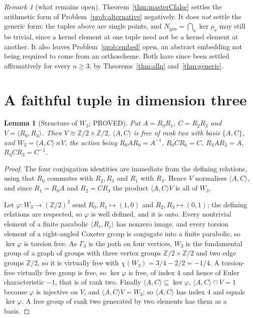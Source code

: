 \documentclass[11pt]{article}
\newtheorem{lemma}[theorem]{Lemma}
\theoremstyle{definition}
\theoremstyle{remark}
\newtheorem{remark}[theorem]{Remark}
\theoremstyle{definition}
\newcommand{\Z}{\mathbb{Z}}
\begin{document}
\begin{remark}[what remains open]\label{rem:stillopen}
Theorem~\ref{thm:masterCfalse} settles the arithmetic form of Problem~\ref{prob:alternative}
negatively. It does \emph{not} settle the generic form: the tuples above are single points, and
$N_{\mathrm{gen}}=\bigcap_a\ker\rho_a$ may still be trivial, since a kernel element at one tuple
need not be a kernel element at another. It also leaves Problem~\ref{prob:embed} open, an
abstract embedding not being required to come from an orthoscheme. Both have since been settled
affirmatively for every $n\ge3$, by Theorems~\ref{thm:alln} and~\ref{thm:generic}.
\end{remark}

\section{A faithful tuple in dimension three}\label{sec:faithful}

\begin{lemma}[Structure of $W_3$; PROVED]\label{lem:W3struct}
Put $A=R_0R_1$, $C=R_2R_3$ and $V=\langle R_0,R_3\rangle$. Then $V\cong\Z/2\times\Z/2$,
$\langle A,C\rangle$ is free of rank two with basis $\{A,C\}$, and
$W_3=\langle A,C\rangle\rtimes V$, the action being
$R_0AR_0=A^{-1}$, $R_0CR_0=C$, $R_3AR_3=A$, $R_3CR_3=C^{-1}$.
\end{lemma}

\begin{proof}
The four conjugation identities are immediate from the defining relations, using that $R_0$
commutes with $R_2,R_3$ and $R_1$ with $R_3$. Hence $V$ normalises $\langle A,C\rangle$, and since
$R_1=R_0A$ and $R_2=CR_3$ the product $\langle A,C\rangle V$ is all of $W_3$.

Let $\varphi\colon W_3\to(\Z/2)^2$ send $R_0,R_1\mapsto(1,0)$ and $R_2,R_3\mapsto(0,1)$; the
defining relations are respected, so $\varphi$ is well defined, and it is onto. Every nontrivial
element of a finite parabolic $\langle R_i,R_j\rangle$ has nonzero image, and every torsion
element of a right-angled Coxeter group is conjugate into a finite parabolic, so $\ker\varphi$ is
torsion free. As $\Gamma_3$ is the path on four vertices, $W_3$ is the fundamental group of a
graph of groups with three vertex groups $\Z/2\times\Z/2$ and two edge groups $\Z/2$, so it is
virtually free with $\chi(W_3)=3/4-2/2=-1/4$. A torsion-free virtually free group is free, so
$\ker\varphi$ is free, of index $4$ and hence of Euler characteristic $-1$, that is of rank two.
Finally $\langle A,C\rangle\subseteq\ker\varphi$, $\langle A,C\rangle\cap V=1$ because
$\varphi$ is injective on $V$, and $\langle A,C\rangle V=W_3$; so $\langle A,C\rangle$ has index
$4$ and equals $\ker\varphi$. A free group of rank two generated by two elements has them as a
basis.
\end{proof}
\end{document}

